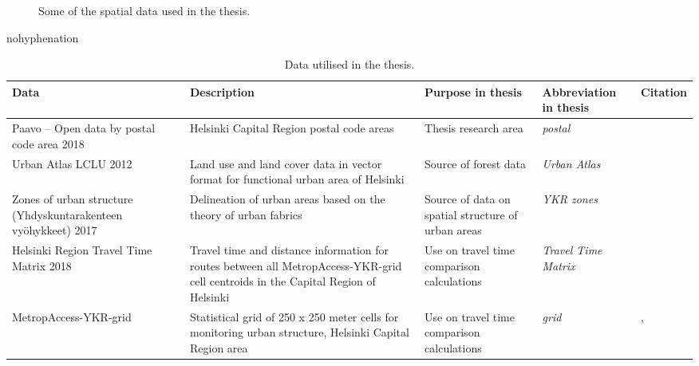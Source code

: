\begin{figure}[H]
    \caption[Spatial data]{Some of the spatial data used in the thesis.}%
    \label{fig:datalayers}%
\end{figure}

\begin{hyphenrules}{nohyphenation}
    \begin{table}[H]
        \centering
        \caption[Thesis data]{Data utilised in the thesis.} 
        \label{tab:used_data}
        \scalebox{0.8}
        {\def\arraystretch{1.2} 
        \setlength\tabcolsep{1.2ex}
        \begin{tabular}{ @{} >{\raggedright\arraybackslash}p{4cm} >{\raggedright\arraybackslash}p{4cm} >{\raggedright\arraybackslash}p{4.5cm} >{\raggedright\arraybackslash}p{3.5cm} >{\raggedleft\arraybackslash}p{3.5cm} @{} }
            \toprule
            Data & Description & Purpose in thesis & Abbreviation in thesis & Citation \\
            \midrule
            Paavo -- Open data by postal code area 2018 & Helsinki Capital Region postal code areas & Thesis research area & \textit{postal} & \cite{StatisticsFinland2019a} \\
            Urban Atlas LCLU 2012 & Land use and land cover data in vector format for functional urban area of Helsinki & Source of forest data & \textit{Urban Atlas} & \cite{EuropeanEnvironmentAgency2016} \\
            Zones of urban structure (Yhdyskuntarakenteen vyöhykkeet) 2017 & Delineation of urban areas based on the theory of urban fabrics & Source of data on spatial structure of urban areas & \textit{YKR zones} & \cite{Ristimaki2017} \\
            Helsinki Region Travel Time Matrix 2018 & Travel time and distance information for routes between all MetropAccess-YKR-grid cell centroids in the Capital Region of Helsinki & Use on travel time comparison calculations & \textit{Travel Time Matrix} & \cite{Tenkanen2018} \\
            MetropAccess-YKR-grid & Statistical grid of 250 x 250 meter cells for monitoring urban structure, Helsinki Capital Region area & Use on travel time comparison calculations & \textit{grid} & \cite{Toivonen2014a}, \cite{StatisticsFinland2020} \\

\end{tabular}}
\end{table}
\end{hyphenrules}
